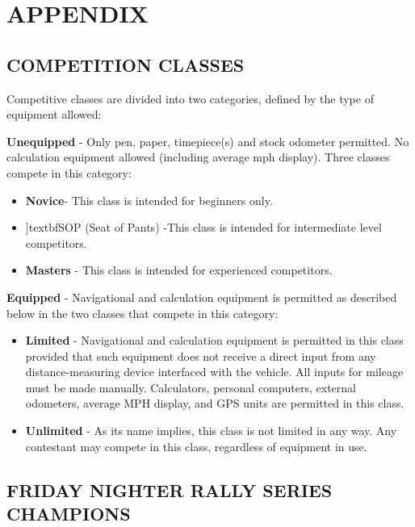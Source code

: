 \section{APPENDIX}
\subsection{COMPETITION CLASSES}
Competitive classes are divided into two categories, defined by the
type of equipment allowed:

\textbf{Unequipped} - Only pen, paper, timepiece(s) and stock odometer permitted. No calculation equipment allowed (including average mph display). Three classes compete in this category:
\begin{itemize}
\item \textbf{Novice}- This class is intended for beginners only.
\item ]textbf{SOP (Seat of Pants)} -This class is intended for intermediate level competitors.
\item \textbf{Masters} - This class is intended for experienced competitors.
\end{itemize}

\textbf{Equipped} - Navigational and calculation equipment is permitted as described below in the two classes that compete in this category:
\begin{itemize}
\item \textbf{Limited} - Navigational and calculation equipment is permitted in this class provided that such equipment does not receive a direct input from any distance-measuring device interfaced with the
vehicle. All inputs for mileage must be made manually. Calculators, personal computers, external odometers, average MPH display, and GPS units are permitted in this class.

\item \textbf{Unlimited} - As its name implies, this class is not limited in any way. Any contestant may compete in this class, regardless of equipment in use.
\end{itemize}

\subsection{FRIDAY NIGHTER RALLY SERIES CHAMPIONS}

